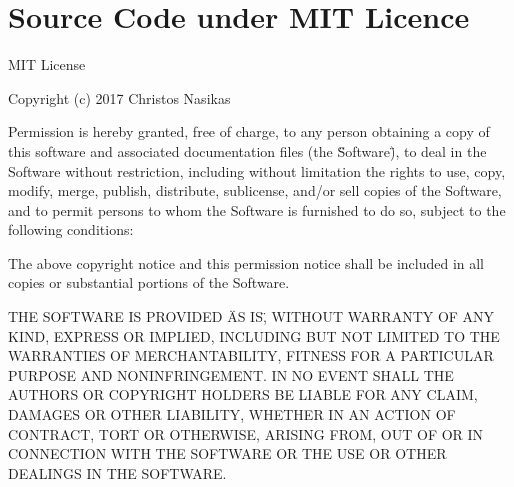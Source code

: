 \chapter{Source Code under MIT Licence}
\label{AppendixA}

MIT License

Copyright (c) 2017 Christos Nasikas

Permission is hereby granted, free of charge, to any person obtaining a copy
of this software and associated documentation files (the \"Software\"), to deal
in the Software without restriction, including without limitation the rights
to use, copy, modify, merge, publish, distribute, sublicense, and/or sell
copies of the Software, and to permit persons to whom the Software is
furnished to do so, subject to the following conditions:

The above copyright notice and this permission notice shall be included in all
copies or substantial portions of the Software.

THE SOFTWARE IS PROVIDED \"AS IS\", WITHOUT WARRANTY OF ANY KIND, EXPRESS OR
IMPLIED, INCLUDING BUT NOT LIMITED TO THE WARRANTIES OF MERCHANTABILITY,
FITNESS FOR A PARTICULAR PURPOSE AND NONINFRINGEMENT. IN NO EVENT SHALL THE
AUTHORS OR COPYRIGHT HOLDERS BE LIABLE FOR ANY CLAIM, DAMAGES OR OTHER
LIABILITY, WHETHER IN AN ACTION OF CONTRACT, TORT OR OTHERWISE, ARISING FROM,
OUT OF OR IN CONNECTION WITH THE SOFTWARE OR THE USE OR OTHER DEALINGS IN THE
SOFTWARE.
